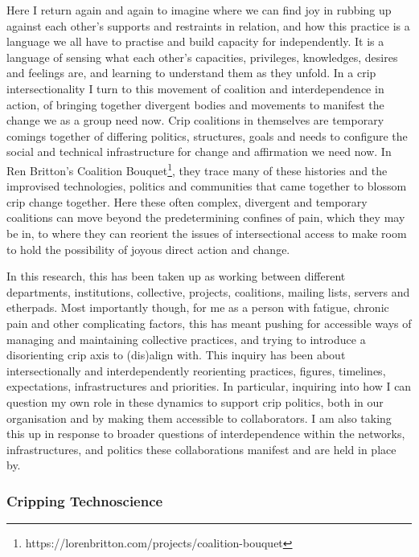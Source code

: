 Here I return again and again to imagine where we can find joy in
rubbing up against each other's supports and restraints in relation, and
how this practice is a language we all have to practise and build
capacity for independently. It is a language of sensing what each
other's capacities, privileges, knowledges, desires and feelings are,
and learning to understand them as they unfold. In a crip
intersectionality I turn to this movement of coalition and
interdependence in action, of bringing together divergent bodies and
movements to manifest the change we as a group need now. Crip coalitions
in themselves are temporary comings together of differing politics,
structures, goals and needs to configure the social and technical
infrastructure for change and affirmation we need now. In Ren Britton's
Coalition Bouquet\footnote{https://lorenbritton.com/projects/coalition-bouquet},
they trace many of these histories and the improvised technologies,
politics and communities that came together to blossom crip change
together. Here these often complex, divergent and temporary coalitions
can move beyond the predetermining confines of pain, which they may be
in, to where they can reorient the issues of intersectional access to
make room to hold the possibility of joyous direct action and change.

In this research, this has been taken up as working between different
departments, institutions, collective, projects, coalitions, mailing
lists, servers and etherpads. Most importantly though, for me as a
person with fatigue, chronic pain and other complicating factors, this
has meant pushing for accessible ways of managing and maintaining
collective practices, and trying to introduce a disorienting crip axis
to (dis)align with. This inquiry has been about intersectionally and
interdependently reorienting practices, figures, timelines,
expectations, infrastructures and priorities. In particular, inquiring
into how I can question my own role in these dynamics to support crip
politics, both in our organisation and by making them accessible to
collaborators. I am also taking this up in response to broader questions
of interdependence within the networks, infrastructures, and politics
these collaborations manifest and are held in place by.

\hypertarget{cripping-technoscience}{%
\subsubsection[Cripping
Technoscience]{\texorpdfstring{\protect\hypertarget{anchor}{}{}Cripping
Technoscience}{Cripping Technoscience}}\label{cripping-technoscience}}

